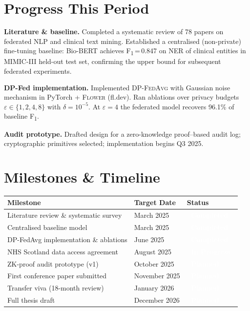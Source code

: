 \documentclass[11pt, a4paper]{article}
\newcommand{\done}{\textcolor{white}{\bfseries\footnotesize\ Completed\ }}
\newcommand{\inprog}{\textcolor{white}{\bfseries\footnotesize\ In Progress\ }}
\newcommand{\pending}{\textcolor{white}{\bfseries\footnotesize\ Planned\ }}
\newcommand{\statCompleted}{%
  \colorbox{accent!80!black}{\done}}
\newcommand{\statInProgress}{%
  \colorbox{accent}{\inprog}}
\newcommand{\statPlanned}{%
  \colorbox{neutral!60}{\pending}}
\begin{document}
\section{Progress This Period}

\textbf{Literature \& baseline.}\enspace
Completed a systematic review of 78 papers on federated NLP and clinical text mining.
Established a centralised (non-private) fine-tuning baseline: Bio-BERT achieves
F\textsubscript{1}\,=\,0.847 on NER of clinical entities in MIMIC-III held-out test
set, confirming the upper bound for subsequent federated experiments.

\textbf{DP-Fed implementation.}\enspace
Implemented \textsc{DP-FedAvg} with Gaussian noise mechanism in PyTorch +
\textsc{Flower} (fl.dev). Ran ablations over privacy budgets
$\varepsilon \in \{1, 2, 4, 8\}$ with $\delta = 10^{-5}$.
At $\varepsilon = 4$ the federated model recovers 96.1\% of baseline F\textsubscript{1}.

\textbf{Audit prototype.}\enspace
Drafted design for a zero-knowledge proof–based audit log;
cryptographic primitives selected; implementation begins Q3 2025.

\section{Milestones \& Timeline}

\renewcommand{\arraystretch}{1.25}
\begin{tabularx}{\linewidth}{@{}lX>{\centering\arraybackslash}l@{}}
  \toprule
  \textbf{\color{accent}Milestone} &
  \textbf{\color{accent}Target Date} &
  \textbf{\color{accent}Status} \\
  \midrule
  Literature review \& systematic survey        & March 2025      & \statCompleted \\
  Centralised baseline model                    & March 2025      & \statCompleted \\
  DP-FedAvg implementation \& ablations         & June 2025       & \statCompleted \\
  NHS Scotland data access agreement            & August 2025     & \statInProgress \\
  ZK-proof audit prototype (v1)                 & October 2025    & \statPlanned \\
  First conference paper submitted              & November 2025   & \statPlanned \\
  Transfer viva (18-month review)               & January 2026    & \statPlanned \\
  Full thesis draft                             & December 2026   & \statPlanned \\
  \bottomrule
\end{tabularx}
\renewcommand{\arraystretch}{1}
\end{document}
